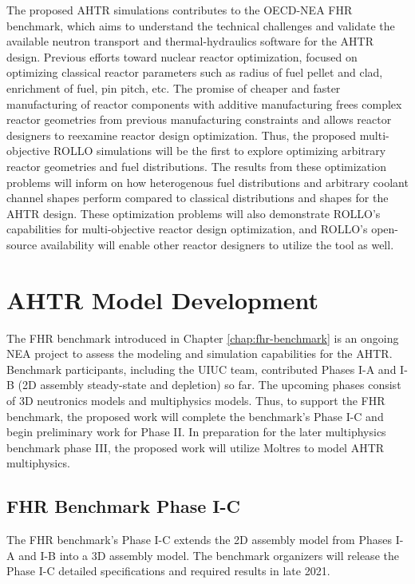 The proposed \gls{AHTR} simulations contributes to the \gls{OECD}-\gls{NEA}
\gls{FHR} benchmark, which aims to understand the technical challenges and validate 
the available neutron transport and thermal-hydraulics software for the \gls{AHTR}
design.
Previous efforts toward nuclear reactor optimization, focused on optimizing 
classical reactor parameters such as radius of fuel pellet and clad, enrichment 
of fuel, pin pitch, etc. 
The promise of cheaper and faster manufacturing of reactor components with 
additive manufacturing frees complex reactor geometries from previous 
manufacturing constraints and allows reactor designers to reexamine reactor 
design optimization. 
Thus, the proposed multi-objective \gls{ROLLO} simulations will be the first 
to explore optimizing arbitrary reactor geometries and fuel distributions. 
The results from these optimization problems will inform on how heterogenous 
fuel distributions and arbitrary coolant channel shapes perform compared to 
classical distributions and shapes for the \gls{AHTR} design. 
These optimization problems will also demonstrate \gls{ROLLO}'s capabilities 
for multi-objective reactor design optimization, and \gls{ROLLO}'s open-source 
availability will enable other reactor designers to utilize the tool as well. 

\section{AHTR Model Development}
The \gls{FHR} benchmark introduced in Chapter \ref{chap:fhr-benchmark} is an 
ongoing \gls{NEA} project to assess the modeling and simulation capabilities 
for the \gls{AHTR}. 
Benchmark participants, including the \gls{UIUC} team, contributed Phases I-A 
and I-B (2D assembly steady-state and depletion) so far.  
The upcoming phases consist of 3D neutronics models and multiphysics models. 
Thus, to support the \gls{FHR} benchmark, the proposed work will complete the 
benchmark's Phase I-C and begin preliminary work for Phase II.
In preparation for the later multiphysics benchmark phase III, the proposed 
work will utilize Moltres to model \gls{AHTR} multiphysics.

\subsection{FHR Benchmark Phase I-C}
The \gls{FHR} benchmark's Phase I-C extends the 2D assembly model from Phases 
I-A and I-B into a 3D assembly model. 
The benchmark organizers will release the Phase I-C detailed specifications and 
required results in late 2021.

